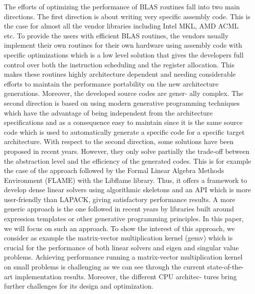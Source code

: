 \documentclass[../main]{subfiles}
\begin{document}
The efforts of optimizing the performance of BLAS routines
fall into two main directions. The first direction is about
writing very specific assembly code. This is the case for
almost all the vendor libraries including Intel MKL\cite{hpcs1},
AMD ACML\cite{hpcs2} etc. To provide the users with efficient BLAS
routines, the vendors usually implement their own routines
for their own hardware using assembly code with specific
optimizations which is a low level solution that gives the
developers full control over both the instruction scheduling
and the register allocation. This makes these routines highly
architecture dependent and needing considerable efforts to
maintain the performance portability on the new architecture
generations. Moreover, the developed source codes are gener-
ally complex. The second direction is based on using modern
generative programming techniques which have the advantage
of being independent from the architecture specifications and
as a consequence easy to maintain since it is the same source
code which is used to automatically generate a specific code
for a specific target architecture. With respect to the second
direction, some solutions have been proposed in recent years.
However, they only solve partially the trade-off between the
abstraction level and the efficiency of the generated codes.
This is for example the case of the approach followed by
the Formal Linear Algebra Methods Environment (FLAME)
with the Libflame library\cite{hpcs3}. Thus, it offers a framework to
develop dense linear solvers using algorithmic skeletons\cite{hpcs4}
and an API which is more user-friendly than LAPACK, giving
satisfactory performance results. A more generic approach is
the one followed in recent years by \cpp libraries built around
expression templates\cite{hpcs5} or other generative programming\cite{hpcs6}
principles. In this paper, we will focus on such an approach.
To show the interest of this approach, we consider as
example the matrix-vector multiplication kernel (gemv) which
is crucial for the performance of both linear solvers and eigen
and singular value problems. Achieving performance running
a matrix-vector multiplication kernel on small problems is
challenging as we can see through the current state-of-the-art
implementation results. Moreover, the different CPU architec-
tures bring further challenges for its design and optimization.
\end{document}
